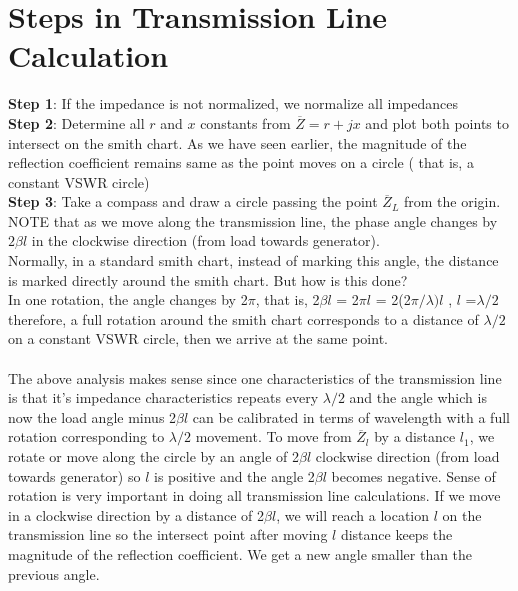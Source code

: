\section{Steps in Transmission Line Calculation}
\textbf{Step 1}: If the impedance is not normalized, we normalize all impedances\\
\textbf{Step 2}: Determine all $r$ and $x$ constants from $\overline{Z} = r + jx$ and plot both points to intersect on the smith chart.
As we have seen earlier, the magnitude of the reflection coefficient remains same as the point moves on a circle (
that is, a constant VSWR circle)\\
\textbf{Step 3}: Take a compass and draw a circle passing the point $\overline{Z}_L$ from the origin.\\
NOTE that as we move along the transmission line, the phase angle changes by $2\beta{l}$ in the clockwise direction (from load towards generator).\\
Normally, in a standard smith chart, instead of marking this angle, the distance is marked directly around the smith chart. But how is this done?\\
In one rotation, the angle changes by 2$\pi$, that is, 2$\beta{l}$ = 2$\pi{l}$ = 2(2$\pi/\lambda){l}$ , $l$ =$\lambda/2$ therefore, a full rotation around the smith chart corresponds to a distance of $\lambda/2$ on a constant VSWR circle, then we arrive at the same point.\\\\
The above analysis makes sense since one characteristics of the transmission line is that it's impedance characteristics repeats every $\lambda/2$ and the angle which is now the load angle minus 2$\beta{l}$ can be calibrated in terms of wavelength with a full rotation corresponding to $\lambda/2$ movement. To move from $\overline{Z}_{l}$ by a distance $l_1$, we rotate or move along the circle by an angle of 2$\beta{l}$ clockwise direction (from load towards generator) so $l$ is positive and the angle 2$\beta{l}$ becomes negative. Sense of rotation is very important in doing  all transmission line calculations. If we move in a clockwise direction by a distance of 2$\beta{l}$, we will reach a location $l$ on the transmission line so the intersect point after moving $l$ distance keeps the magnitude of the reflection coefficient. We get a new angle smaller than the previous angle.\\

